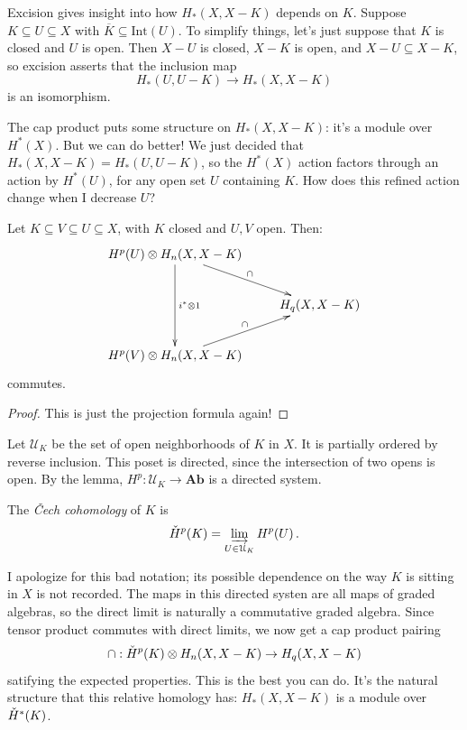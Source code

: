 Excision gives insight into how $H_\ast(X,X-K)$ depends on $K$. 
Suppose $K\subseteq U\subseteq X$ with $\overline{K}\subseteq\mathrm{Int}(U)$. To simplify things, let's just suppose that $K$ is closed and $U$ is open.
Then $X-U$ is closed, $X-K$ is open, and $X-U\subseteq X-K$, so excision asserts that the inclusion map 
\[
H_*(U,U-K)\to H_*(X,X-K)
\]
is an isomorphism. 

The cap product puts some structure on $H_*(X,X-K)$: it's a module over 
$H^*(X)$. But we can do better! We just decided that $H_*(X,X-K)=H_*(U,U-K)$,
so the $H^*(X)$ action factors through an action by $H^*(U)$, for any open 
set $U$ containing $K$. How does this refined action change when I decrease 
$U$?
\begin{lemma}
Let $K\subseteq V\subseteq U\subseteq X$, with $K$ closed and $U,V$ open. Then:
\begin{equation*}
\xymatrix{
	 H^p(U)\ar[dd]^{i^\ast\otimes 1}\otimes H_n(X,X-K)\ar[dr]^\cap & \\
	 & H_q(X,X-K)\\
	 H^p(V)\otimes H_n(X,X-K)\ar[ur]^\cap
}
\end{equation*}
commutes.
\end{lemma}
\begin{proof}
This is just the projection formula again!
\end{proof}
Let $\mathcal{U}_K$ be the set of open neighborhoods of $K$ in $X$. It is partially ordered by reverse inclusion. This poset is directed, since the intersection of two opens is open. By the lemma, $H^p:\mathcal{U}_K\to\mathbf{Ab}$ 
is a directed system. 
\begin{definition}
The {\em \v{C}ech cohomology} of $K$ is
\[
\check{H}^p(K)=\varinjlim_{U\in\mathcal{U}_K} H^p(U)\,.
\]
\end{definition}
I apologize for this bad notation; its possible dependence on the way $K$ is sitting in $X$ is not recorded. The maps in this directed systen are all maps of graded algebras, so the direct limit is naturally a commutative graded algebra. 
Since tensor product commutes with direct limits, we now get a cap product
pairing 
\[
\cap:\check{H}^p(K)\otimes H_n(X,X-K)\to H_q(X,X-K)
\]
satifying the expected properties. 
This is the best you can do. It's the natural structure that this relative homology has: $ H_\ast(X,X-K)$ is a module over $\check{H}^\ast(K)$.

